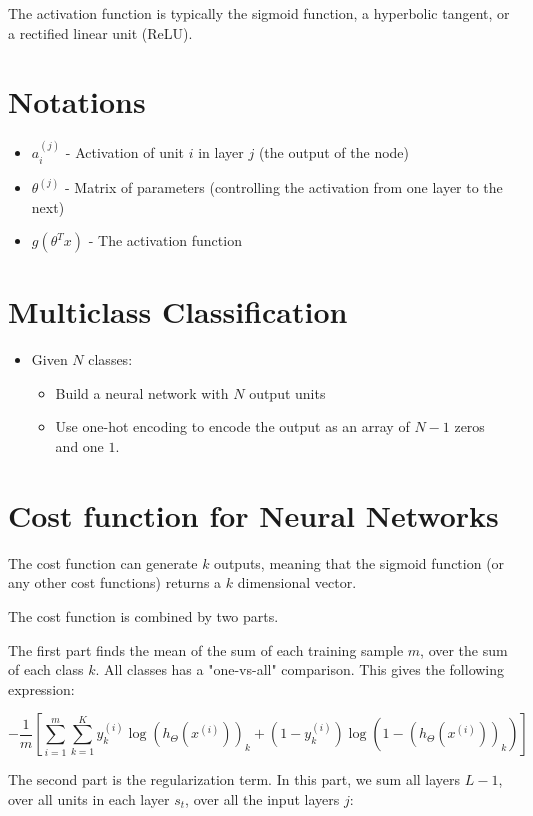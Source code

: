 The activation function is typically the sigmoid function, a hyperbolic tangent, or a rectified linear unit (ReLU).

\section{Notations}
\begin{itemize}
    \item $a_i^{(j)}$ - Activation of unit $i$ in layer $j$ (the output of the node)
    \item $\theta^{(j)}$ - Matrix of parameters (controlling the activation from one layer to the next)
    \item $g(\theta^Tx)$ - The activation function
\end{itemize}

\section{Multiclass Classification}
\begin{itemize}
    \item Given $N$ classes:
    \begin{itemize}
        \item Build a neural network with $N$ output units
        \item Use one-hot encoding to encode the output as an array of $N-1$ zeros and one $1$.
    \end{itemize}
\end{itemize}

\section{Cost function for Neural Networks}
The cost function can generate $k$ outputs, meaning that the sigmoid function (or any other cost functions) returns a $k$ dimensional vector.

The cost function is combined by two parts.

\bigskip

The first part finds the mean of the sum of each training sample $m$, over the sum of each class $k$. All classes has a "one-vs-all" comparison. This gives the following expression:

\[
    -\frac{1}{m}\left[\sum_{i=1}^m\sum_{k=1}^Ky_k^{(i)} \log\left(h_\Theta(x^{(i)})\right)_k+(1-y_k^{(i)}) \log\left(1-(h_\Theta(x^{(i)}))_k\right)\right]
\]

The second part is the regularization term. In this part, we sum all layers $L-1$, over all units in each layer $s_t$, over all the input layers $j$:

